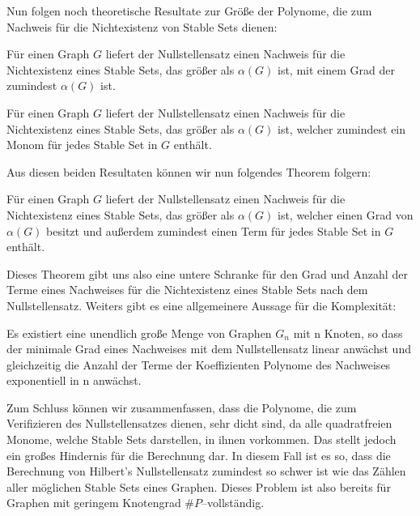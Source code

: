 \noindent Nun folgen noch theoretische Resultate zur Größe der Polynome, die zum Nachweis für die Nichtexistenz von Stable Sets dienen:

\begin{theorem}
Für einen Graph $G$ liefert der Nullstellensatz einen Nachweis für die Nichtexistenz eines Stable Sets, das größer als $\alpha(G)$ ist, mit einem Grad der zumindest $\alpha(G)$ ist.
\end{theorem}

\begin{corollary}
Für einen Graph $G$ liefert der Nullstellensatz einen Nachweis für die Nichtexistenz eines Stable Sets, das größer als $\alpha(G)$ ist, welcher zumindest ein Monom für jedes Stable Set in $G$ enthält.
\end{corollary}

\noindent Aus diesen beiden Resultaten können wir nun folgendes Theorem folgern:

\begin{theorem}
Für einen Graph $G$ liefert der Nullstellensatz einen Nachweis für die Nichtexistenz eines Stable Sets, das größer als $\alpha(G)$ ist, welcher einen Grad von $\alpha(G)$ besitzt und außerdem zumindest einen Term für jedes Stable Set in $G$ enthält.
\end{theorem}

\noindent Dieses Theorem gibt uns also eine untere Schranke für den Grad und Anzahl der Terme eines Nachweises für die Nichtexistenz eines Stable Sets nach dem Nullstellensatz. Weiters gibt es eine allgemeinere Aussage für die Komplexität:

\begin{corollary}
Es existiert eine unendlich große Menge von Graphen $G_n$ mit n Knoten, so dass der minimale Grad eines Nachweises mit dem Nullstellensatz linear anwächst und gleichzeitig die Anzahl der Terme der Koeffizienten Polynome des Nachweises exponentiell in n anwächst.
\end{corollary}


\noindent Zum Schluss können wir zusammenfassen, dass die Polynome, die zum Verifizieren des Nullstellensatzes dienen, sehr dicht sind, da alle quadratfreien Monome, welche Stable Sets darstellen, in ihnen vorkommen.
Das stellt jedoch ein großes Hindernis für die Berechnung dar. In diesem Fall ist es so, dass die Berechnung von Hilbert's Nullstellensatz zumindest so schwer ist wie das Zählen aller möglichen Stable Sets eines Graphen. Dieses Problem ist also bereits für Graphen mit geringem Knotengrad $\#P$--vollständig. \cite{Ausgangsartikel, Loera2009}




